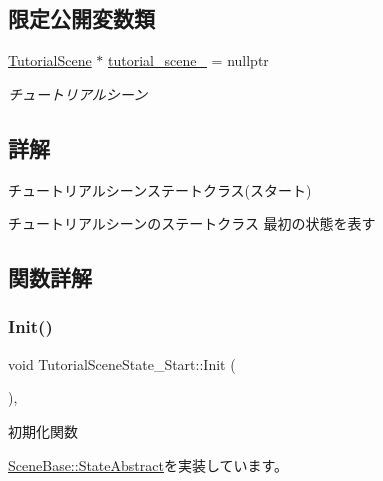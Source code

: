 \subsection*{限定公開変数類}
\begin{DoxyCompactItemize}
\item 
\mbox{\hyperlink{class_tutorial_scene}{Tutorial\+Scene}} $\ast$ \mbox{\hyperlink{class_tutorial_scene_state___start_a1fea5f4f4713a1461a86cbc9fc263e41}{tutorial\+\_\+scene\+\_\+}} = nullptr
\begin{DoxyCompactList}\small\item\em チュートリアルシーン \end{DoxyCompactList}\end{DoxyCompactItemize}


\subsection{詳解}
チュートリアルシーンステートクラス(スタート) 

チュートリアルシーンのステートクラス 最初の状態を表す 

\subsection{関数詳解}
\mbox{\label{class_tutorial_scene_state___start_acd4cd7e4efeebffa9616d7ca31c7b1c0}} 
\subsubsection{\texorpdfstring{Init()}{Init()}}
{\footnotesize\ttfamily void Tutorial\+Scene\+State\+\_\+\+Start\+::\+Init (\begin{DoxyParamCaption}{ }\end{DoxyParamCaption})\hspace{0.3cm}{\ttfamily [override]}, {\ttfamily [virtual]}}



初期化関数 



\mbox{\hyperlink{class_scene_base_1_1_state_abstract_a2f5ea12e789aa52df179e6df469b870d}{Scene\+Base\+::\+State\+Abstract}}を実装しています。

\mbox{\label{class_tutorial_scene_state___start_a40bfdf7acd93b619138bf708adff31e4}} 
